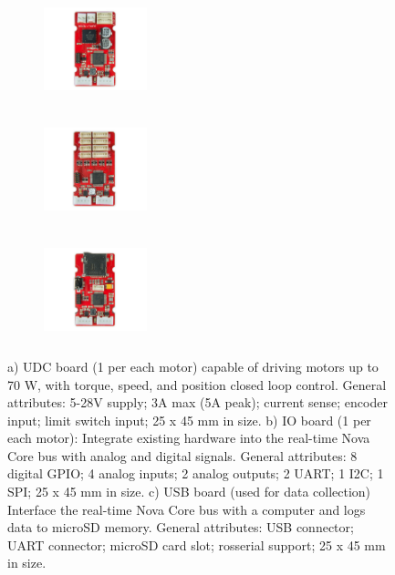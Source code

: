 \begin{figure}[H]
  \centering
  \begin{subfigure}[b]{0.3\textwidth}
  \centering
      \includegraphics[width=3cm,height=3cm]{images/03-foundation/udc}
	\caption{}
  \end{subfigure}
  \begin{subfigure}[b]{0.3\textwidth}
  \centering
      \includegraphics[width=3cm,height=3cm]{images/03-foundation/io}
	\caption{}
  \end{subfigure}
  \begin{subfigure}[b]{0.3\textwidth}
  \centering
      \includegraphics[width=3cm,height=3cm]{images/03-foundation/usb}
	\caption{}
	\label{fig:usb_board}
  \end{subfigure}
  \caption{a) UDC board (1 per each motor) capable of driving motors up to 70 W, with torque, speed, and position closed loop control. General attributes: 5-28V supply; 3A max (5A peak); current sense; encoder input; limit switch input; 25 x 45 mm in size. b) IO board (1 per each motor): Integrate existing hardware into the real-time Nova Core bus with analog and digital signals. General attributes: 8 digital GPIO;  4 analog inputs; 2 analog outputs; 2 UART; 1 I2C; 1 SPI; 25 x 45 mm in size. c) USB board (used for data collection) Interface the real-time Nova Core bus with a computer and logs data to microSD memory. General attributes: USB connector;  UART connector; microSD card slot; rosserial support; 25 x 45 mm in size.}
  \label{fig:boards}
\end{figure}


